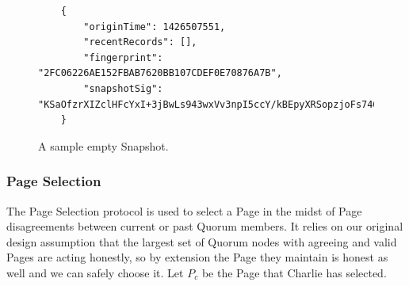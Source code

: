 \begin{figure}
	\begin{lstlisting}
	{
		"originTime": 1426507551,
		"recentRecords": [],
		"fingerprint": "2FC06226AE152FBAB7620BB107CDEF0E70876A7B",
		"snapshotSig": "KSaOfzrXIZclHFcYxI+3jBwLs943wxVv3npI5ccY/kBEpyXRSopzjoFs746n0tJqUpdY4Kbe6DBwERaN7ELmSSK9Pu6q8QeKzNAh+QOnKl0fKBN7fqowjkQ3ktFkR0Vuox9WrrbNTMa4+up0Np52hlbKA3zSRz4fbR9NVlh6uuQ="
	}
	\end{lstlisting}
	\caption{A sample empty Snapshot.}
	\label{fig:emptySnapshot}
\end{figure}

\subsubsection{Page Selection}

The Page Selection protocol is used to select a Page in the midst of Page disagreements between current or past Quorum members. It relies on our original design assumption that the largest set of Quorum nodes with agreeing and valid Pages are acting honestly, so by extension the Page they maintain is honest as well and we can safely choose it. Let $ P_{c} $ be the Page that Charlie has selected.


